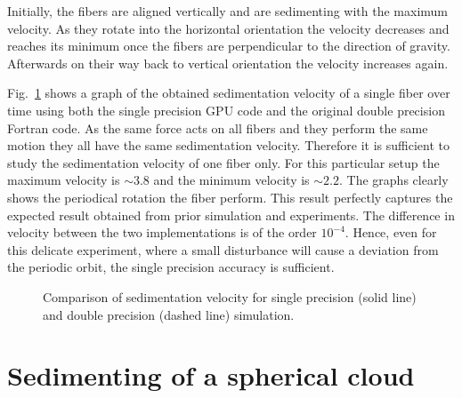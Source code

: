 Initially, the fibers are aligned vertically and are sedimenting with the maximum velocity. As they rotate into the horizontal orientation the velocity decreases and reaches its minimum once the fibers are perpendicular to the direction of gravity. Afterwards on their way back to vertical orientation the velocity increases again.

Fig.~\ref{fig:ring_sedimentation_velocity} shows a graph of the obtained sedimentation velocity of a single fiber over time using both the single precision GPU code and the original double precision Fortran code. As the same force acts on all fibers and they perform the same motion they all have the same sedimentation velocity. Therefore it is sufficient to study the sedimentation velocity of one fiber only. For this particular setup the maximum velocity is ${\sim}3.8$ and the minimum velocity is ${\sim}2.2$. The graphs clearly shows the periodical rotation the fiber perform. This result perfectly captures the expected result obtained from prior simulation and experiments. The difference in velocity between the two implementations is of the order $10^{-4}$. Hence, even for this delicate experiment, where a small disturbance will cause a deviation from the periodic orbit, the single precision accuracy is sufficient.

\begin{figure}[!htbp]
  \centering
  \caption[Comparison of sedimentation velocity for single- and double-precision simulation.]{Comparison of sedimentation velocity for single precision (solid line) and double precision (dashed line) simulation.}
  \label{fig:ring_sedimentation_velocity}
\end{figure}

\section{Sedimenting of a spherical cloud}
\label{sec:example_sphere}

